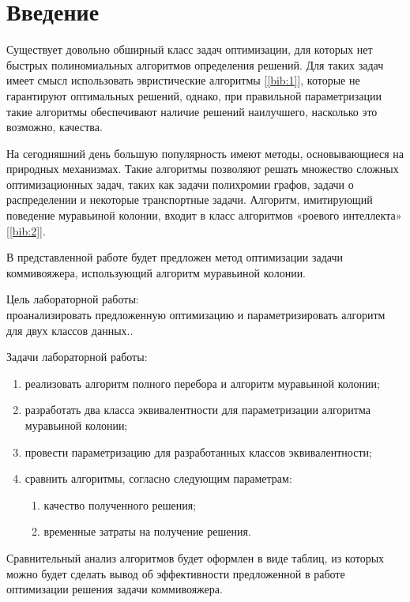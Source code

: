 \section*{\large Введение}

\par Существует довольно обширный класс задач оптимизации, для которых нет быстрых полиномиальных алгоритмов определения решений. Для таких задач имеет смысл использовать эвристические алгоритмы [\ref{bib:1}], которые не гарантируют оптимальных решений, однако, при правильной параметризации такие алгоритмы обеспечивают наличие решений наилучшего, насколько это возможно, качества.
\par На сегодняшний день большую популярность имеют методы, основывающиеся на природных механизмах. Такие алгоритмы позволяют решать множество сложных оптимизационных задач, таких как задачи полихромии графов, задачи о распределении и некоторые транспортные задачи. Алгоритм, имитирующий поведение муравьиной колонии, входит в класс алгоритмов «роевого интеллекта» [\ref{bib:2}].
\par В представленной работе будет предложен метод оптимизации задачи коммивояжера, использующий алгоритм муравьиной колонии.

	Цель лабораторной работы:\\
	проанализировать предложенную оптимизацию и параметризировать алгоритм для двух классов данных..

	Задачи лабораторной работы:
	\begin{enumerate}
		\item реализовать алгоритм полного перебора и алгоритм муравьиной колонии;
		\item разработать два класса эквивалентности для параметризации алгоритма муравьиной колонии;
		\item провести параметризацию для разработанных классов эквивалентности;
		\item сравнить алгоритмы, согласно следующим параметрам:
		\begin{enumerate}
			\item качество полученного решения;
			\item временные затраты на получение решения.
		\end{enumerate}
	\end{enumerate}
Сравнительный анализ алгоритмов будет оформлен в виде таблиц, из которых можно будет сделать вывод об эффективности предложенной в работе оптимизации решения задачи коммивояжера.
\newpage